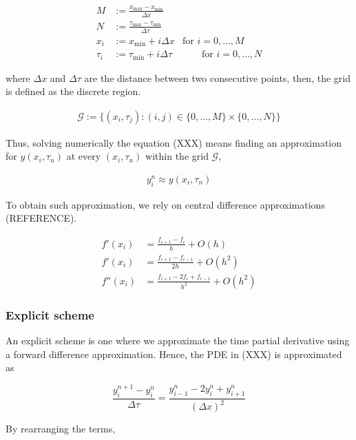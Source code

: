 \begin{align}
  M &:= \frac{x_{\text{max}} - x_{\text{min}}}{\Delta x} \\ 
  N &:= \frac{\tau_{\text{max}} - \tau_{\text{min}}}{\Delta \tau} \\ 
  x_i &:= x_{\text{min}} + i\Delta x & \text{for $i = 0,\dots, M$} \\
  \tau_i &:= \tau_{\text{min}} + i{\Delta \tau} & \qquad \text{for $i = 0,\dots, N$}
\end{align}

where $\Delta x$ and $\Delta \tau$ are the distance between two consecutive points,
then, the grid is defined as the discrete region. 

\begin{align}
  \mathcal{G} := \{(x_i, \tau_j): (i, j) \in \{0,\dots,M\}\times\{0,\dots,N\}\}
\end{align}

Thus, solving numerically the equation (XXX) means finding an approximation for $y(x_i, \tau_n)$ at every 
$(x_i, \tau_n)$ within the grid $\mathcal{G}$,

\begin{align}
  y^{n}_i \approx y(x_i,\tau_n)
\end{align}

To obtain such approximation, we rely on central difference approximations (REFERENCE).

\begin{align}
  f'(x_i) &= \frac{f_{i+1} - f_{i}}{h} + O(h) \\
  f'(x_i) &= \frac{f_{i+1} - f_{i-1}}{2h} + O(h^2) \\
  f''(x_i) &= \frac{f_{i+1} - 2f_{i} + f_{i-1}}{h^2} + O(h^2)
\end{align}

\subsubsection{Explicit scheme}

An explicit scheme is one where we approximate the time partial derivative using
a forward difference approximation. Hence, the PDE in (XXX) is approximated as

\begin{equation}
  \frac{y^{n+1}_{i} - y^{n}_{i}}{\Delta \tau} = \frac{y^{n}_{i-1} - 2y^{n}_{i} + y^{n}_{i+1}}{(\Delta x)^2}
\end{equation}

By rearranging the terms,


